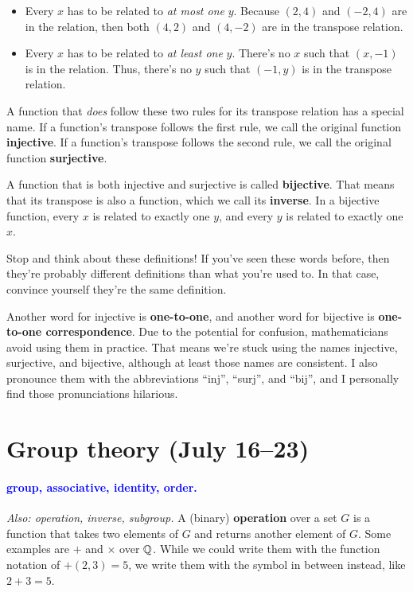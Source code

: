 \documentclass[11pt,paper=letter]{scrartcl}
\renewcommand{\bluebf}[1]{{\bfseries \color{Blue} #1}}
\renewcommand\wp[1]{\paragraph{\textcolor{Blue}{#1.}} \hspace{-1em}}
\newcommand\wl[1]{\label{w:#1}}
\newcommand\oww[1]{\textit{Also: #1.}}
\begin{document}
\begin{itemize}
  \item Every $x$ has to be related to \textit{at most one} $y$. Because $(2, 4)$ and $(-2, 4)$ are in the relation, then both $(4, 2)$ and $(4, -2)$ are in the transpose relation.
  \item Every $x$ has to be related to \textit{at least one} $y$. There's no $x$ such that $(x, -1)$ is in the relation. Thus, there's no $y$ such that $(-1, y)$ is in the transpose relation.
\end{itemize}

A function that \textit{does} follow these two rules for its transpose relation has a special name. If a function's transpose follows the first rule, we call the original function \textbf{injective}. If a function's transpose follows the second rule, we call the original function \textbf{surjective}.

A function that is both injective and surjective is called \textbf{bijective}. That means that its transpose is also a function, which we call its \textbf{inverse}. In a bijective function, every $x$ is related to exactly one $y$, and every $y$ is related to exactly one $x$.

\begin{exrboxed}
  Stop and think about these definitions! If you've seen these words before, then they're probably different definitions than what you're used to. In that case, convince yourself they're the same definition.
\end{exrboxed}

Another word for injective is \bluebf{one-to-one}, and another word for bijective is \bluebf{one-to-one correspondence}. Due to the potential for confusion, mathematicians avoid using them in practice. That means we're stuck using the names injective, surjective, and bijective, although at least those names are consistent. I also pronounce them with the abbreviations ``inj'', ``surj'', and ``bij'', and I personally find those pronunciations hilarious.

\section{Group theory (July 16--23)}

\wp{group, associative, identity, order}
\wl{group}
\wl{associative}
\wl{identity}
\wl{order}
\oww{operation, inverse, subgroup}
A (binary) \textbf{operation} over a set $G$ is a function that takes two elements of $G$ and returns another element of $G$. Some examples are $+$ and $\times$ over $\mathbb Q$. While we could write them with the function notation of $+(2, 3) = 5$, we write them with the symbol in between instead, like $2 + 3 = 5$.
\end{document}
